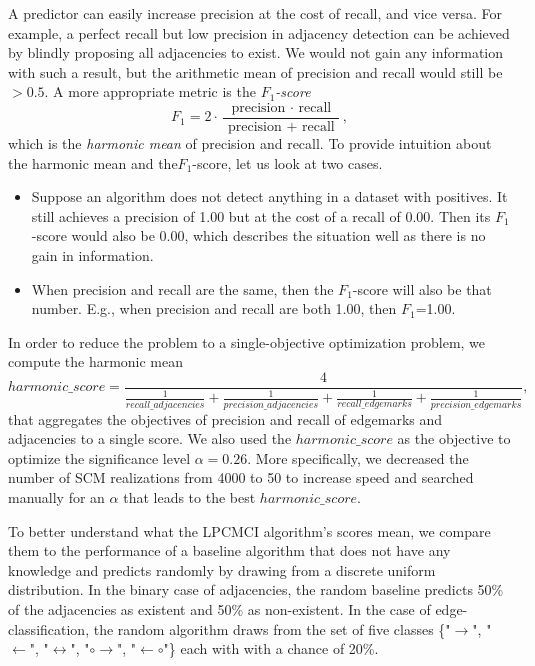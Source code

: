 \documentclass[conference]{IEEEtran}
\begin{document}
A predictor can easily increase precision at the cost of recall, and vice versa. For example, a perfect recall but low precision in adjacency detection can be achieved by blindly proposing all adjacencies to exist. We would not gain any information with such a result, but the arithmetic mean of precision and recall would still be $>0.5$. A more appropriate metric is the \textit{$F_1$-score}
\begin{equation}
F_{1}=2 \cdot \frac{\text { precision } \cdot \text { recall }}{\text { precision }+\text { recall }},
\end{equation}
which is the \textit{harmonic mean} of precision and recall.
To provide intuition about the harmonic mean and the$F_1$-score, let us look at two cases.
\begin{itemize}
    \item Suppose an algorithm does not detect anything in a dataset with positives. It still achieves a precision of 1.00 but at the cost of a recall of 0.00. Then its $F_1$-score would also be 0.00, which describes the situation well as there is no gain in information.
    \item When precision and recall are the same, then the $F_1$-score will also be that number. E.g., when precision and recall are both 1.00, then $F_1$=1.00.
\end{itemize}
In order to reduce the problem to a single-objective optimization problem, we compute the harmonic mean
\begin{equation}
harmonic\_score=\frac{4}{\frac{1}{recall\_adjacencies}+\frac{1}{precision\_adjacencies}+\frac{1}{recall\_edgemarks}+\frac{1}{precision\_edgemarks}},
\label{eq:harmonicscore}
\end{equation}
that aggregates the objectives of precision and recall of edgemarks and adjacencies to a single score.
We also used the $harmonic\_score$ as the objective to optimize the significance level $\alpha=0.26$. More specifically, we decreased the number of SCM realizations from 4000 to 50 to increase speed and searched manually for an $\alpha$ that leads to the best $harmonic\_score$.

To better understand what the LPCMCI algorithm's scores mean, we compare them to the performance of a baseline algorithm that does not have any knowledge and predicts randomly by drawing from a discrete uniform distribution.
In the binary case of adjacencies, the random baseline predicts 50\% of the adjacencies as existent and 50\% as non-existent.
In the case of edge-classification, the random algorithm draws from the set of five classes \{"$\rightarrow$", "$\leftarrow$", "$\leftrightarrow$", "$\circ$$\rightarrow$", "$\leftarrow$$\circ$"\} each with with a chance of 20\%.
\end{document}
